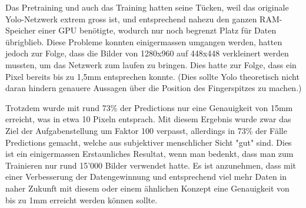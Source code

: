 Das Pretraining und auch das Training hatten seine Tücken, weil das originale Yolo-Netzwerk extrem gross ist, und entsprechend nahezu den ganzen RAM-Speicher einer GPU benötigte, wodurch nur noch begrenzt Platz für Daten übrigblieb. 
Diese Probleme konnten einigermassen umgangen werden, hatten jedoch zur Folge, dass die Bilder von 1280x960 auf 448x448 verkleinert werden mussten, um das Netzwerk zum laufen zu bringen. 
Dies hatte zur Folge, dass ein Pixel bereits bis zu 1,5mm entsprechen konnte. (Dies sollte Yolo theoretisch nicht daran hindern genauere Aussagen über die Position des Fingerspitzes zu machen.) 

Trotzdem wurde mit rund 73\% der Predictions \grqq{}nur\grqq{} eine Genauigkeit von 15mm erreicht, was in etwa 10 Pixeln entsprach. 
Mit diesem Ergebnis wurde zwar das Ziel der Aufgabenstellung um Faktor 100 verpasst, allerdings in 73\% der Fälle Predictions gemacht, welche aus subjektiver menschlicher Sicht "gut" sind.
Dies ist ein einigermassen Erstaunliches Resultat, wenn man bedenkt, dass man zum Trainieren nur rund 15'000 Bilder verwendet hatte. 
Es ist anzunehmen, dass mit einer Verbesserung der Datengewinnung und entsprechend viel mehr Daten in naher Zukunft mit diesem oder einem ähnlichen Konzept eine Genauigkeit von bis zu 1mm erreicht werden können sollte.  

